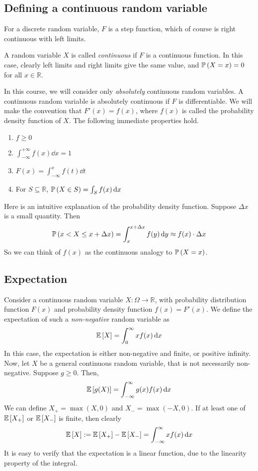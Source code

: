 \subsection{Defining a continuous random variable}
For a discrete random variable, \(F\) is a step function, which of course is right continuous with left limits.
\begin{definition}
	A random variable \(X\) is called \textit{continuous} if \(F\) is a continuous function.
	In this case, clearly left limits and right limits give the same value, and \(\mathbb{P}\left({X = x}\right) = 0\) for all \(x \in\mathbb R\).
\end{definition}
\noindent In this course, we will consider only \textit{absolutely} continuous random variables.
A continuous random variable is absolutely continuous if \(F\) is differentiable.
We will make the convention that \(F'(x) = f(x)\), where \(f(x)\) is called the probability density function of \(X\).
The following immediate properties hold.
\begin{enumerate}
	\item \(f \geq 0\)
	\item \(\int_{-\infty}^{+\infty} f(x) \dd{x} = 1\)
	\item \(F(x) = \int_{-\infty}^x f(t) \dd{t}\)
	\item For \(S \subseteq \mathbb R\), \(\mathbb{P}\left({X \in S}\right) = \int_S f(x) \dd{x}\)
\end{enumerate}
Here is an intuitive explanation of the probability density function.
Suppose \(\Delta x\) is a small quantity.
Then
\[
	\mathbb{P}\left({x < X \leq x + \Delta x}\right) = \int_x^{x + \Delta x} f(y) \dd{y} \approx f(x) \cdot \Delta x
\]
So we can think of \(f(x)\) as the continuous analogy to \(\mathbb{P}\left({X = x}\right)\).

\subsection{Expectation}
Consider a continuous random variable \(X \colon \Omega \to \mathbb R\), with probability distribution function \(F(x)\) and probability density function \(f(x) = F'(x)\).
We define the expectation of such a \textit{non-negative} random variable as
\[
	\mathbb{E}\left[{X}\right] = \int_0^\infty x f(x) \dd{x}
\]
In this case, the expectation is either non-negative and finite, or positive infinity.
Now, let \(X\) be a general continuous random variable, that is not necessarily non-negative.
Suppose \(g \geq 0\).
Then,
\[
	\mathbb{E}\left[{g(X)}\right] = \int_{-\infty}^\infty g(x) f(x) \dd{x}
\]
We can define \(X_+ = \max(X, 0)\) and \(X_- = \max(-X, 0)\).
If at least one of \(\mathbb{E}\left[{X_+}\right]\) or \(\mathbb{E}\left[{X_-}\right]\) is finite, then clearly
\[
	\mathbb{E}\left[{X}\right] := \mathbb{E}\left[{X_+}\right] - \mathbb{E}\left[{X_-}\right] = \int_{-\infty}^\infty xf(x) \dd{x}
\]
It is easy to verify that the expectation is a linear function, due to the linearity property of the integral.

